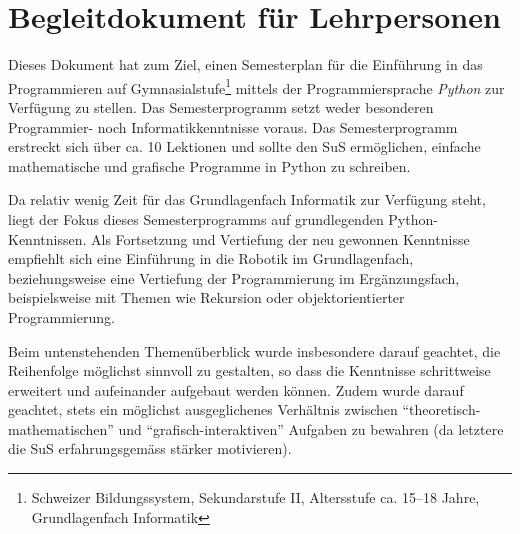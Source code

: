 \chapter*{Begleitdokument für Lehrpersonen}

Dieses Dokument hat zum Ziel, einen Semesterplan für die Einführung in das Programmieren auf Gymnasialstufe\footnote{Schweizer Bildungssystem, Sekundarstufe II, Altersstufe ca. 15--18 Jahre, Grundlagenfach Informatik} mittels der Programmiersprache \textit{Python} zur Verfügung zu stellen. Das Semesterprogramm setzt weder besonderen Programmier- noch Informatikkenntnisse voraus. Das Semesterprogramm erstreckt sich über ca. 10 Lektionen und sollte den SuS ermöglichen, einfache mathematische und grafische Programme in Python zu schreiben.

Da relativ wenig Zeit für das Grundlagenfach Informatik zur Verfügung steht, liegt der Fokus dieses Semesterprogramms auf grundlegenden Python-Kenntnissen. Als Fortsetzung und Vertiefung der neu gewonnen Kenntnisse empfiehlt sich eine Einführung in die Robotik im Grundlagenfach, beziehungsweise eine Vertiefung der Programmierung im Ergänzungsfach, beispielsweise mit Themen wie Rekursion oder objektorientierter Programmierung.

Beim untenstehenden Themenüberblick wurde insbesondere darauf geachtet, die Reihenfolge möglichst sinnvoll zu gestalten, so dass die Kenntnisse schrittweise erweitert und aufeinander aufgebaut werden können. Zudem wurde darauf geachtet, stets ein möglichst ausgeglichenes Verhältnis zwischen \enquote{theoretisch-mathematischen} und \enquote{grafisch-interaktiven} Aufgaben zu bewahren (da letztere die SuS erfahrungsgemäss stärker motivieren).

